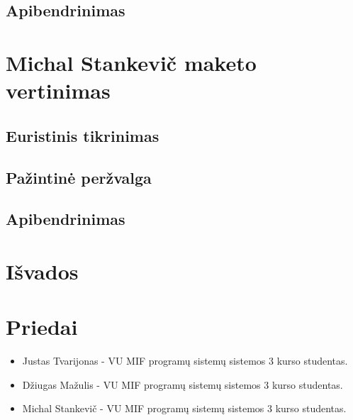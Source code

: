 \documentclass[oneside]{VUMIFPSkursinis}
\begin{document}
\subsection{Apibendrinimas}
\section{Michal Stankevič maketo vertinimas}
\subsection{Euristinis tikrinimas}
\subsection{Pažintinė peržvalga}
\subsection{Apibendrinimas}
\section{Išvados}
\section{Priedai}
	\begin{itemize}
		\item Justas Tvarijonas - VU MIF programų sistemų sistemos 3 kurso studentas.
		\item Džiugas Mažulis - VU MIF programų sistemų sistemos 3 kurso studentas.
		\item Michal Stankevič - VU MIF programų sistemų sistemos 3 kurso studentas.
	\end{itemize}
\end{document}
